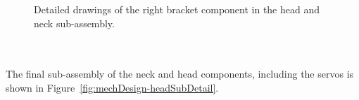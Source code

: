         \begin{figure}[h!]
        \centering
        \caption[Detailed drawings of the right bracket component in the head and neck sub-assembly.]{Detailed drawings of the right bracket component in the head and neck sub-assembly.}
        \label{fig:mechDesign-headRightBracket}
        \end{figure}

      \\\\
        The final sub-assembly of the neck and head components, including the servos is shown in Figure~\ref{fig:mechDesign-headSubDetail}.
        
